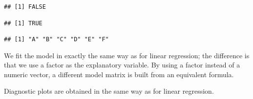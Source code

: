 \documentclass[krantz2]{krantz}\usepackage{knitr}
\begin{document}
\begin{knitrout}\footnotesize
{}\color{fgcolor}\begin{kframe}
\begin{alltt}
\hlopt{$}
\end{alltt}
\begin{verbatim}
## [1] FALSE
\end{verbatim}
\begin{alltt}
\hlopt{$}
\end{alltt}
\begin{verbatim}
## [1] TRUE
\end{verbatim}
\begin{alltt}
\hlopt{$}
\end{alltt}
\begin{verbatim}
## [1] "A" "B" "C" "D" "E" "F"
\end{verbatim}
\end{kframe}
\end{knitrout}

We fit the model in exactly the same way as for linear regression; the difference is that we use a factor as the explanatory variable. By using a factor instead of a numeric vector, a different model matrix is built from an equivalent formula.\label{chunk:stat:fm4}

\begin{knitrout}\footnotesize
{}\color{fgcolor}\begin{kframe}
\begin{alltt}
 \hlkwb{<-}  \hlopt{~}   
\end{alltt}
\end{kframe}
\end{knitrout}

Diagnostic plots are obtained in the same way as for linear regression.
\end{document}
